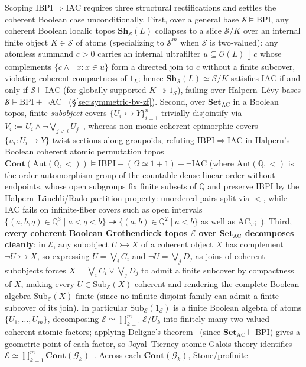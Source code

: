 \documentclass[10pt,twoside,openright]{book}
\theoremstyle{crmplain}
\theoremstyle{crmdef}
\theoremstyle{crmremark}
\begin{document}
Scoping $\mathrm{IBPI} \Rightarrow \mathrm{IAC}$ requires three structural rectifications and settles the coherent Boolean case unconditionally. First, over a general base $\mathcal{S} \models \mathrm{BPI}$, any coherent Boolean localic topos $\mathbf{Sh}_{\mathcal{S}}(L)$ collapses to a slice $\mathcal{S}/K$ over an internal finite object $K \in \mathcal{S}$ of atoms (specializing to $\mathcal{S}^m$ when $\mathcal{S}$ is two-valued): any atomless summand $c > 0$ carries an internal ultrafilter $u \subseteq \mathcal{O}(L){\downarrow}c$ whose complements $\{c \wedge \neg x : x \in u\}$ form a directed join to $c$ without a finite subcover, violating coherent compactness of $1_L$; hence $\mathbf{Sh}_{\mathcal{S}}(L) \simeq \mathcal{S}/K$ satisfies $\mathrm{IAC}$ if and only if $\mathcal{S} \models \mathrm{IAC}$ (for globally supported $K \twoheadrightarrow 1_{\mathcal{S}}$), failing over Halpern--L\'evy bases $\mathcal{S} \models \mathrm{BPI}+\neg\mathrm{AC}$~\cite{HalpernLevy71} (\S\ref{sec:symmetric-bv-zf}). Second, over $\mathbf{Set}_{\mathrm{AC}}$ in a Boolean topos, finite \emph{subobject} covers $\{U_i \rightarrowtail Y\}_{i=1}^n$ trivially disjointify via $V_i := U_i \wedge \neg\bigvee_{j<i} U_j$~\cite{Johnstone02}, whereas non-monic coherent epimorphic covers $\{u_i : U_i \to Y\}$ twist sections along groupoids, refuting $\mathrm{IBPI} \Rightarrow \mathrm{IAC}$ in Halpern's Boolean coherent atomic permutation topos $\mathbf{Cont}(\mathrm{Aut}(\mathbb{Q}, <)) \models \mathrm{IBPI} + (\Omega \simeq 1+1) + \neg\mathrm{IAC}$ (where $\mathrm{Aut}(\mathbb{Q}, <)$ is the order-automorphism group of the countable dense linear order without endpoints, whose open subgroups fix finite subsets of $\mathbb{Q}$ and preserve $\mathrm{IBPI}$ by the Halpern--L\"auchli/Rado partition property: unordered pairs split via $<$, while $\mathrm{IAC}$ fails on infinite-fiber covers such as open intervals $\{(a, b, q) \in \mathbb{Q}^3 \mid a < q < b\} \twoheadrightarrow \{(a, b) \in \mathbb{Q}^2 \mid a < b\}$ as well as $\mathrm{AC}_\omega$;~\cite{Caramello18,Kihara26}). Third, \textbf{every coherent Boolean Grothendieck topos $\mathcal{E}$ over $\mathbf{Set}_{\mathrm{AC}}$ decomposes cleanly}: in $\mathcal{E}$, any subobject $U \rightarrowtail X$ of a coherent object $X$ has complement $\neg U \rightarrowtail X$, so expressing $U = \bigvee_i C_i$ and $\neg U = \bigvee_j D_j$ as joins of coherent subobjects forces $X = \bigvee_i C_i \vee \bigvee_j D_j$ to admit a finite subcover by compactness of $X$, making every $U \in \mathrm{Sub}_{\mathcal{E}}(X)$ coherent and rendering the complete Boolean algebra $\mathrm{Sub}_{\mathcal{E}}(X)$ finite (since no infinite disjoint family can admit a finite subcover of its join). In particular $\mathrm{Sub}_{\mathcal{E}}(1_{\mathcal{E}})$ is a finite Boolean algebra of atoms $\{U_1, \dots, U_m\}$, decomposing $\mathcal{E} \simeq \prod_{k=1}^m \mathcal{E}/U_k$ into finitely many two-valued coherent atomic factors; applying Deligne's theorem~\cite{Deligne72} (since $\mathbf{Set}_{\mathrm{AC}} \models \mathrm{BPI}$) gives a geometric point of each factor, so Joyal--Tierney atomic Galois theory identifies $\mathcal{E} \simeq \prod_{k=1}^m \mathbf{Cont}(\mathcal{G}_k)$~\cite[\S C5.3]{Johnstone02}. Across each $\mathbf{Cont}(\mathcal{G}_k)$, Stone/profinite 
\end{document}
